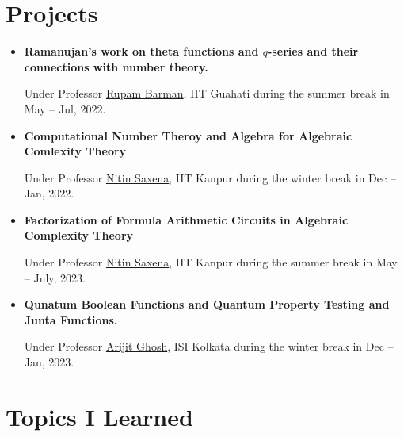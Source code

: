 \documentclass[10pt,a4paper,sans,colorlinks]{moderncv}        %
\begin{document}
\section{Projects}
\begin{itemize}
	\item \textbf{Ramanujan's work on theta functions and $q$-series and their connections with number theory.}

	      \hfill Under Professor \href{https://www.iitg.ac.in/rupam/}{Rupam Barman}, IIT Guahati during the summer break in May -- Jul, 2022.

	\item \textbf{Computational Number Theroy and Algebra for Algebraic Comlexity Theory }

	      \hfill Under Professor \href{https://www.cse.iitk.ac.in/users/nitin/}{Nitin Saxena}, IIT Kanpur during the winter break in Dec -- Jan, 2022.
	      
	\item \textbf{Factorization of Formula Arithmetic Circuits in Algebraic Complexity Theory }
	
	\hfill Under Professor \href{https://www.cse.iitk.ac.in/users/nitin/}{Nitin Saxena}, IIT Kanpur during the summer break in May -- July, 2023.
	\item \textbf{Qunatum Boolean Functions and Quantum Property Testing and Junta Functions.}
	
	\hfill Under Professor \href{https://sites.google.com/site/homepagearijitghosh/}{Arijit Ghosh}, ISI Kolkata during the winter break in Dec -- Jan, 2023.
\end{itemize}

\section{Topics I Learned}
\end{document}
